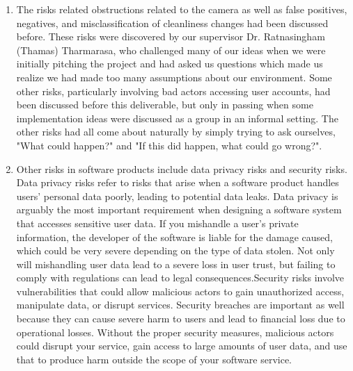 \documentclass[12pt, titlepage]{article}
\begin{document}
\begin{enumerate}
    \item The risks related obstructions related to the camera as well as false positives, negatives, and misclassification of cleanliness changes had been discussed before. These risks were discovered by our supervisor Dr. Ratnasingham (Thamas) Tharmarasa, who challenged many of our ideas when we were initially pitching the project and had asked us questions which made us realize we had made too many assumptions about our environment. Some other risks, particularly involving bad actors accessing user accounts, had been discussed before this deliverable, but only in passing when some implementation ideas were discussed as a group in an informal setting. The other risks had all come about naturally by simply trying to ask ourselves, "What could happen?" and "If this did happen, what could go wrong?".
    
    \item Other risks in software products include data privacy risks and security risks. Data privacy risks refer to risks that arise when a software product handles users' personal data poorly, leading to potential data leaks. Data privacy is arguably the most important requirement when designing a software system that accesses sensitive user data. If you mishandle a user's private information, the developer of the software is liable for the damage caused, which could be very severe depending on the type of data stolen. Not only will mishandling user data lead to a severe loss in user trust, but failing to comply with regulations can lead to legal consequences.\newline Security risks involve vulnerabilities that could allow malicious actors to gain unauthorized access, manipulate data, or disrupt services. Security breaches are important as well because they can cause severe harm to users and lead to financial loss due to operational losses. Without the proper security measures, malicious actors could disrupt your service, gain access to large amounts of user data, and use that to produce harm outside the scope of your software service.
\end{enumerate}
\end{document}
